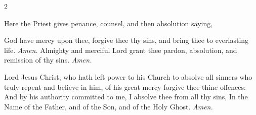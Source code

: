 \begin{multicols}{2}
\begin{rubric}
	{Here the Priest gives penance, counsel, and then absolution saying,}
\end{rubric}
 God have mercy upon thee, forgive thee thy sins, and bring thee to everlasting life. \textit{Amen.}%
 Almighty and merciful Lord grant thee pardon, {} absolution, and remission of thy sins. \textit{Amen.}%
\par\noindent
 Lord Jesus Christ, who hath left power to his Church to absolve all sinners who truly repent and believe in him, of his great mercy forgive thee thine offences: And by his authority committed to me, I absolve thee from all thy sins, In the Name of the Father, {} and of the Son, and of the Holy Ghost. \textit{Amen.}%

\end{multicols}
